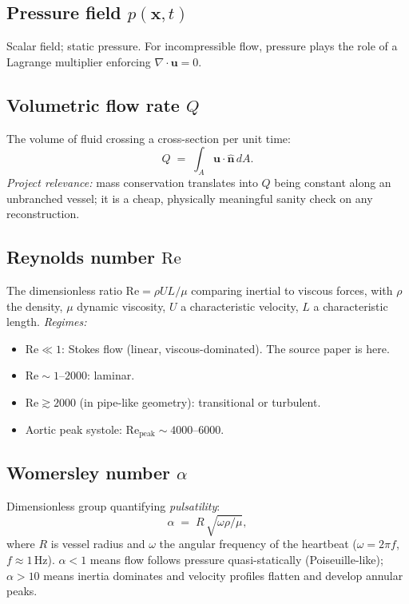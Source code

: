 \documentclass[11pt]{article}
\begin{document}
\subsection*{Pressure field $p(\mathbf{x},t)$}
Scalar field; static pressure. For incompressible flow, pressure plays the role of a Lagrange multiplier enforcing $\nabla\cdot\mathbf{u}=0$.

\subsection*{Volumetric flow rate $Q$}
The volume of fluid crossing a cross-section per unit time:
\[
Q \;=\; \int_A \mathbf{u}\cdot\hat{\mathbf{n}} \, dA.
\]
\textit{Project relevance:} mass conservation translates into $Q$ being constant along an unbranched vessel; it is a cheap, physically meaningful sanity check on any reconstruction.

\subsection*{Reynolds number $\mathrm{Re}$}
The dimensionless ratio $\mathrm{Re} = \rho U L / \mu$ comparing inertial to viscous forces, with $\rho$ the density, $\mu$ dynamic viscosity, $U$ a characteristic velocity, $L$ a characteristic length. \textit{Regimes:}
\begin{itemize}[noitemsep]
  \item $\mathrm{Re} \ll 1$: Stokes flow (linear, viscous-dominated). The source paper is here.
  \item $\mathrm{Re} \sim 1$--$2000$: laminar.
  \item $\mathrm{Re} \gtrsim 2000$ (in pipe-like geometry): transitional or turbulent.
  \item Aortic peak systole: $\mathrm{Re}_{\text{peak}} \sim 4000$--$6000$.
\end{itemize}

\subsection*{Womersley number $\alpha$}
Dimensionless group quantifying \emph{pulsatility}:
\[
\alpha \;=\; R\,\sqrt{\omega \rho / \mu},
\]
where $R$ is vessel radius and $\omega$ the angular frequency of the heartbeat ($\omega = 2\pi f$, $f \approx 1$\,Hz). $\alpha < 1$ means flow follows pressure quasi-statically (Poiseuille-like); $\alpha > 10$ means inertia dominates and velocity profiles flatten and develop annular peaks.
\end{document}
